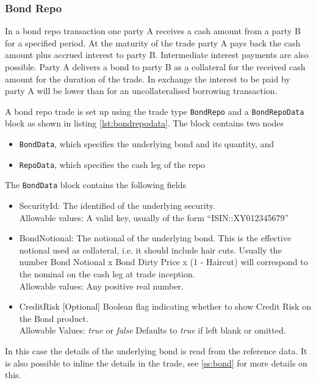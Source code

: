 \subsubsection{Bond Repo}

In a bond repo transaction one party A receives a cash amount from a party B for a specified period. At the maturity of
the trade party A pays back the cash amount plus accrued interest to party B. Intermediate interest payments are also
possible. Party A delivers a bond to party B as a collateral for the received cash amount for the duration of the
trade. In exchange the interest to be paid by party A will be lower than for an uncollateralised borrowing transaction.

A bond repo trade is set up using the trade type \verb+BondRepo+ and a \verb+BondRepoData+ block as shown in listing
\ref{lst:bondrepodata}. The block contains two nodes

\begin{itemize}
\item \verb+BondData+, which specifies the underlying bond and its quantity, and
\item \verb+RepoData+, which specifies the cash leg of the repo
\end{itemize}

The \verb+BondData+ block contains the following fields

\begin{itemize}
\item SecurityId: The identified of the underlying security.\\
  Allowable values: A valid key, usually of the form ``ISIN::XY012345679''
\item BondNotional: The notional of the underlying bond. This is the effective notional used as collateral, i.e. it
  should include hair cuts. Usually the number Bond Notional x Bond Dirty Price x (1 - Haircut) will correspond to the
  nominal on the cash leg at trade inception.\\
  Allowable values: Any positive real number.
    \item CreditRisk [Optional] Boolean flag indicating whether to show Credit Risk on the Bond product. \\
      Allowable Values: \emph{true} or \emph{false} Defaults to \emph{true} if left blank or omitted.    
\end{itemize}

In this case the details of the underlying bond is read from the reference data. It is also possible to inline the
details in the trade, see \ref{ss:bond} for more details on this.

